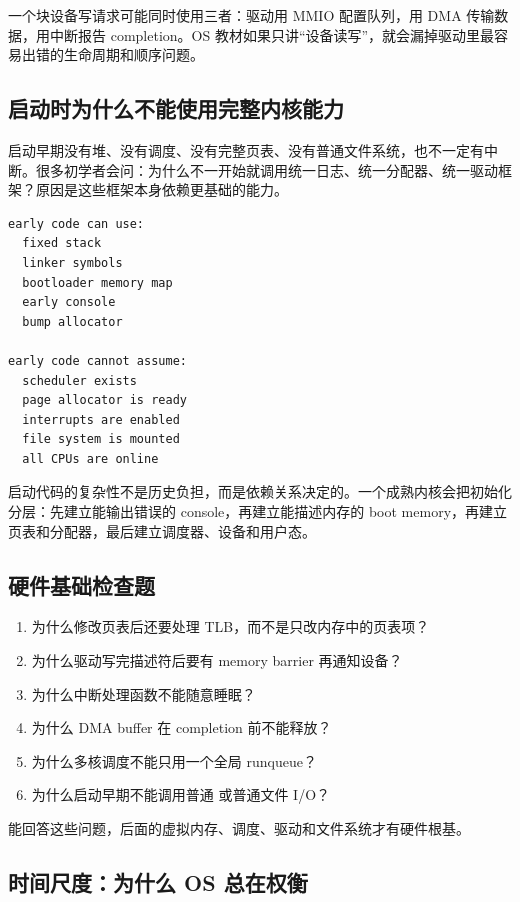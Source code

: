 一个块设备写请求可能同时使用三者：驱动用 MMIO 配置队列，用 DMA 传输数据，用中断报告 completion。OS 教材如果只讲“设备读写”，就会漏掉驱动里最容易出错的生命周期和顺序问题。

\subsection{启动时为什么不能使用完整内核能力}

启动早期没有堆、没有调度、没有完整页表、没有普通文件系统，也不一定有中断。很多初学者会问：为什么不一开始就调用统一日志、统一分配器、统一驱动框架？原因是这些框架本身依赖更基础的能力。

\begin{lstlisting}
early code can use:
  fixed stack
  linker symbols
  bootloader memory map
  early console
  bump allocator

early code cannot assume:
  scheduler exists
  page allocator is ready
  interrupts are enabled
  file system is mounted
  all CPUs are online
\end{lstlisting}

启动代码的复杂性不是历史负担，而是依赖关系决定的。一个成熟内核会把初始化分层：先建立能输出错误的 console，再建立能描述内存的 boot memory，再建立页表和分配器，最后建立调度器、设备和用户态。

\subsection{硬件基础检查题}

\begin{enumerate}
\tightlist
\item 为什么修改页表后还要处理 TLB，而不是只改内存中的页表项？
\item 为什么驱动写完描述符后要有 memory barrier 再通知设备？
\item 为什么中断处理函数不能随意睡眠？
\item 为什么 DMA buffer 在 completion 前不能释放？
\item 为什么多核调度不能只用一个全局 runqueue？
\item 为什么启动早期不能调用普通  或普通文件 I/O？
\end{enumerate}

能回答这些问题，后面的虚拟内存、调度、驱动和文件系统才有硬件根基。

\subsection{时间尺度：为什么 OS 总在权衡}


